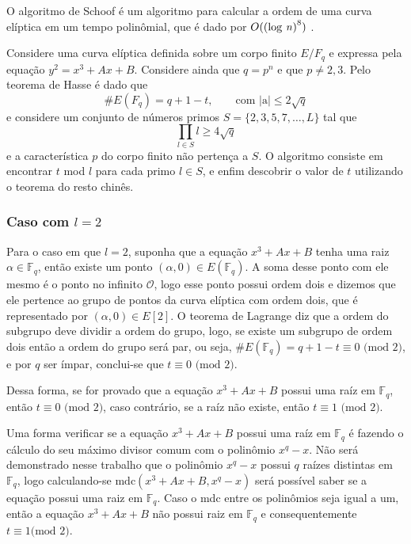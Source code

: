 \begin{apendicesenv}
O algoritmo de Schoof é um algoritmo para calcular a ordem de uma curva elíptica em um tempo polinômial, que é dado por $O(\mbox{(log \textit{n})}^8)$ \cite{Silverman:2009}.

Considere uma curva elíptica definida sobre um corpo finito $E/F_q$ e expressa pela equação $y^2 = x^3 + Ax + B$. Considere ainda que $q = p^n$ e que $p \neq 2,3$. Pelo teorema de Hasse é dado que
$$
\#E(F_q) = q + 1 - t, \qquad \mbox{com |a|} \leq 2 \sqrt{q}
$$
e considere um conjunto de números primos $S = \{2,3,5,7,\dots,L\}$ tal que 
$$
\prod_{l \in S} l \geq 4 \sqrt{q}
$$
e a característica $p$ do corpo finito não pertença a $S$.
O algoritmo consiste em encontrar $t$ mod $l$ para cada primo $l \in S$, e enfim descobrir o valor de $t$ utilizando o teorema do resto chinês.\cite{Alvarado:2005}

\subsubsection{Caso com $l=2$}
Para o caso em que $l = 2$, suponha que a equação $x^3 + Ax + B$ tenha uma raiz $\alpha \in \mathbb{F}_q$, então existe um ponto $(\alpha, 0) \in E(\mathbb{F}_q)$. A soma desse ponto com ele mesmo é o ponto no infinito $\mathcal{O}$, logo esse ponto possui ordem dois e dizemos que ele pertence ao grupo de pontos da curva elíptica com ordem dois, que é representado por $(\alpha,0) \in E[2]$. O teorema de Lagrange diz que a ordem do subgrupo deve dividir a ordem do grupo, logo, se existe um subgrupo de ordem dois então a ordem do grupo será par, ou seja, $\#E(\mathbb{F}_q) = q + 1 - t \equiv 0\mbox{ (mod 2)}$, e por $q$ ser ímpar, conclui-se que $t \equiv 0 \mbox{ (mod 2)}$. \cite{Alvarado:2005}

Dessa forma, se for provado que a equação $x^3 + Ax + B$ possui uma raíz em $\mathbb{F}_q$, então $t \equiv 0 \mbox{ (mod 2)}$, caso contrário, se a raíz não existe, então $t \equiv 1 \mbox{ (mod 2)}$.\cite{McGee:2006}

Uma forma verificar se a equação $x^3 + Ax + B$ possui uma raíz em $\mathbb{F}_q$ é fazendo o cálculo do seu máximo divisor comum com o polinômio $x^q - x$. Não será demonstrado nesse trabalho que o polinômio $x^q - x$ possui $q$ raízes distintas em $\mathbb{F}_q$, logo calculando-se $\mbox{mdc}(x^3 + Ax + B, x^q - x)$ será possível saber se a equação possui uma raiz em $\mathbb{F}_q$. Caso o mdc entre os polinômios seja igual a um, então a equação $x^3 + Ax + B$ não possui raiz em $\mathbb{F}_q$ e consequentemente $t \equiv 1\mbox{(mod 2)}$.\cite{McGee:2006}


\end{apendicesenv}
